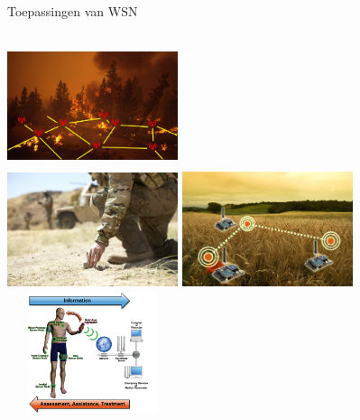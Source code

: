\documentclass[presentation, bigger]{beamer}
\begin{document}
\begin{frame}[label=sec-1-2]{Toepassingen van WSN}

\begin{columns}[t]
\centering
\includegraphics[width=5cm,height=3.5cm]{graphics/sample_applications/fire.jpg}\\
\includegraphics[width=5cm,height=3.5cm]{graphics/sample_applications/military.jpg}
\centering
\includegraphics[width=5cm,height=3.5cm]{graphics/sample_applications/landbouw.jpg}\\
\includegraphics[width=5cm,height=3.5cm]{graphics/sample_applications/medicine.jpg}
\end{columns}

\end{frame}
\end{document}
